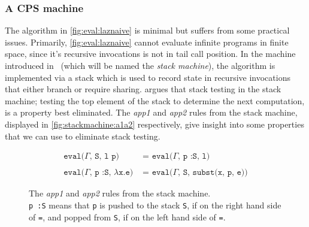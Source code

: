\subsubsection{A CPS machine}
The algorithm in \autoref{fig:eval:laznaive} is minimal but suffers from some practical issues.
Primarily, \autoref{fig:eval:laznaive} cannot evaluate infinite programs in finite space, since it's recursive invocations is not in tail call position.
In the machine introduced in~\cite{sestoft1997deriving} (which will be named the \textit{stack machine}), the algorithm is implemented via a stack which is used to record state in recursive invocations that either branch or require sharing.
\cite{sestoft1997deriving} argues that stack testing in the stack machine; testing the top element of the stack to determine the next computation, is a property best eliminated.
The \textit{app1} and \textit{app2} rules from the stack machine, displayed in \autoref{fig:stackmachine:a1a2} respectively, give insight into some properties that we can use to eliminate stack testing.
\begin{figure}[p]
\begin{mdframed}
\begin{align}
  \texttt{eval($\Gamma$, S, l p) }&\texttt{= eval($\Gamma$, p :S, l)}\tag*{}\\\tag*{}\\
  \texttt{eval($\Gamma$, p :S, $\lambda$x.e) }&\texttt{= eval($\Gamma$, S, subst(x, p, e))}\tag*{}
\end{align}
\end{mdframed}
  \caption{The \textit{app1} and \textit{app2} rules from the stack machine.\\
  \texttt{p :S} means that \texttt{p} is pushed to the stack \texttt{S}, if on the right hand side of \texttt{=}, and popped from \texttt{S}, if on the left hand side of \texttt{=}.}
  \label{fig:stackmachine:a1a2}
\end{figure}

